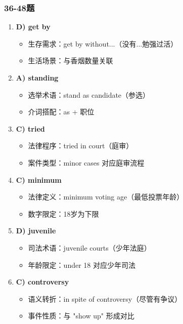 \documentclass{article}
\begin{document}
\subsubsection*{36-48题}
\begin{enumerate}[resume*]
    \item \textbf{D) get by} 
    \begin{itemize}
        \item 生存需求：get by without...（没有...勉强过活）
        \item 生活场景：与香烟数量关联
    \end{itemize}
    
    \item \textbf{A) standing} 
    \begin{itemize}
        \item 选举术语：stand as candidate（参选）
        \item 介词搭配：as + 职位
    \end{itemize}
    
    \item \textbf{C) tried} 
    \begin{itemize}
        \item 法律程序：tried in court（庭审）
        \item 案件类型：minor cases 对应庭审流程
    \end{itemize}
    
    \item \textbf{C) minimum} 
    \begin{itemize}
        \item 法律定义：minimum voting age（最低投票年龄）
        \item 数字限定：18岁为下限
    \end{itemize}
    
    \item \textbf{D) juvenile} 
    \begin{itemize}
        \item 司法术语：juvenile courts（少年法庭）
        \item 年龄限定：under 18 对应少年司法
    \end{itemize}
    
    \item \textbf{C) controversy} 
    \begin{itemize}
        \item 语义转折：in spite of controversy（尽管有争议）
        \item 事件性质：与 "show up" 形成对比
    \end{itemize}
    

\end{enumerate}
\end{document}
